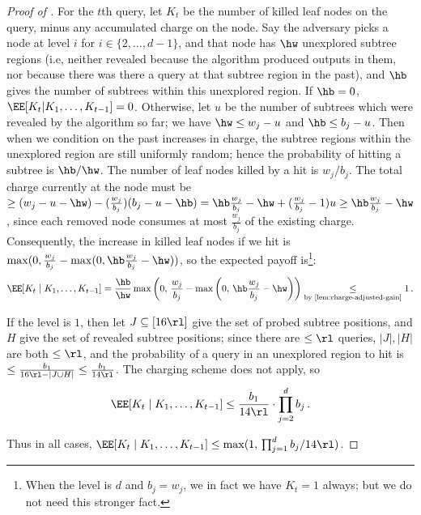 \begin{itemize}
\begin{itemize}
\begin{proof}[Proof of ]
  For the $t$th query, let $K_t$ be the number of killed leaf nodes on the query,
  minus any accumulated charge on the node. Say the adversary picks a node at level $i$ for $i \in \{2,\ldots,d-1\}$, and that
  node has $\hw$ unexplored subtree regions (i.e, neither revealed because
  the algorithm produced outputs in them, nor because there was there a query at that subtree region
  in the past), and $\hb$ gives the number of subtrees within this unexplored
  region. If $\hb = 0$, $\EE[K_t | K_1,\ldots,K_{t-1}] = 0$. Otherwise, let $u$ be the number of subtrees which were revealed by the algorithm so far; we have $\hw \le w_j - u$ and $\hb \le b_j - u$. Then when we condition on the past increases in charge, the subtree regions within the unexplored region are still uniformly random; hence
  the probability of hitting a subtree is $\hb / \hw$. The number of leaf nodes
  killed by a hit is $w_j / b_j$.  The total charge currently at the node must be
  $\ge (w_j - u - \hw) - (\frac{w_j}{b_j}) (b_j - u - \hb) = \hb \frac{w_j}{b_j} - \hw + (\frac{w_j}{b_j} - 1) u \ge \hb \frac{w_j}{b_j} - \hw$, since each removed node consumes at most $\frac{w_j}{b_j}$ of the existing charge.
  Consequently, the increase in killed leaf nodes if we hit is $\max(0, \frac{w_j}{b_j} - \max(0, \hb \frac{w_j}{b_j} - \hw))$, so the expected payoff is\footnote{When the level is $d$ and $b_j=w_j$, we in fact we have $K_t = 1$ always; but we do not need this stronger fact.}:
  \begin{align*}
    \EE[K_t \mid K_1,\ldots,K_{t-1}] = \frac{\hb}{\hw} \max\left(0,\, \frac{w_j}{b_j} - \max\left(0,\, \hb \frac{w_j}{b_j} - \hw\right)\right) \underset{\text{by \Cref{lem:charge-adjusted-gain}}}{\le} 1 \,.
  \end{align*}
  
  If the level is $1$, then let $J \subseteq [16 \rl]$ give the set of probed subtree positions,
  and $H$ give the set of revealed subtree positions; since there are $\le \rl$ queries,
  $|J|,|H|$ are both $\le \rl$, and the probability of a query in an unexplored
  region to hit is $\le \frac{b_1}{16 \rl - |J \cup H|} \le \frac{b_1}{14 \rl}$. The charging scheme does not apply, so
  \begin{align*}
    \EE[K_t \mid K_1,\ldots,K_{t-1}] \le \frac{b_1}{14 \rl} \cdot \prod_{j=2}^{d} b_j \,.
  \end{align*}
  
  Thus in all cases, $\EE[K_t \mid K_1,\ldots,K_{t-1}] \le \max(1,\, \prod_{j=1}^{d} b_j / 14 \rl)$. 
  

\end{proof}
\end{itemize}
\end{itemize}
